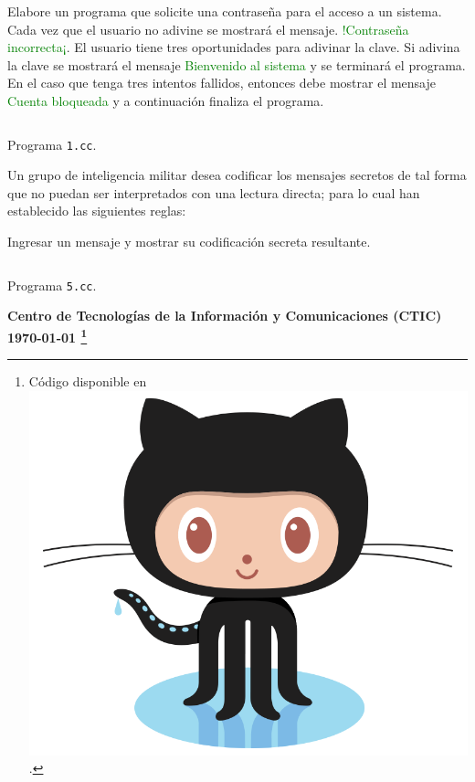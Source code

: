 \documentclass[spanish,addpoints,answers,a4paper]{exam}
\newcommand{\unmarkedfntext}[1]{%
	\begingroup
	\renewcommand\thefootnote{}\footnote{#1}%
	\addtocounter{footnote}{-1}%
	\endgroup
}
\newcommand{\mychar}{%
	\begingroup\normalfont
	\includegraphics[height=\fontcharht\font`\B]{Octocat.png}%
	\endgroup
}
\begin{document}
\begin{questions}

\question Elabore un programa que solicite una contraseña para el acceso a un sistema. Cada vez que el usuario no adivine se mostrará el mensaje. \textcolor{green}{!Contraseña incorrecta¡}. El usuario tiene tres oportunidades para adivinar la clave. Si adivina la clave se mostrará el mensaje \textcolor{green}{Bienvenido al sistema} y se terminará el programa. En el caso que tenga tres intentos fallidos, entonces debe mostrar el mensaje \textcolor{green}{Cuenta bloqueada} y a continuación finaliza el programa.

\begin{solution}
	\begin{listing}[H]
		\footnotesize
		\inputminted{cpp}{1.cc}
		\caption{Programa \texttt{1.cc}.}
		\label{lst:7.1}
\end{listing}
\end{solution}

\setcounter{question}{4}
\question Un grupo de inteligencia militar desea codificar los mensajes secretos de tal forma que no puedan ser interpretados con una lectura directa; para lo cual han establecido las siguientes reglas:

Ingresar un mensaje y mostrar su codificación secreta resultante.

\setcounter{listing}{4}
\begin{solution}
	\begin{listing}[H]
		\footnotesize
		\inputminted{cpp}{5.cc}
		\caption{Programa \texttt{5.cc}.}
		\label{lst:7.2}
\end{listing}
\end{solution}

\end{questions}

\begin{flushright}\bfseries
Centro de Tecnologías de la Información y Comunicaciones (CTIC)\\[2mm]
\today\unmarkedfntext{Código disponible en \href{https://github.com/carlosal1015/Cpp-Programming}{\mychar{}}.}
\end{flushright}
\end{document}
